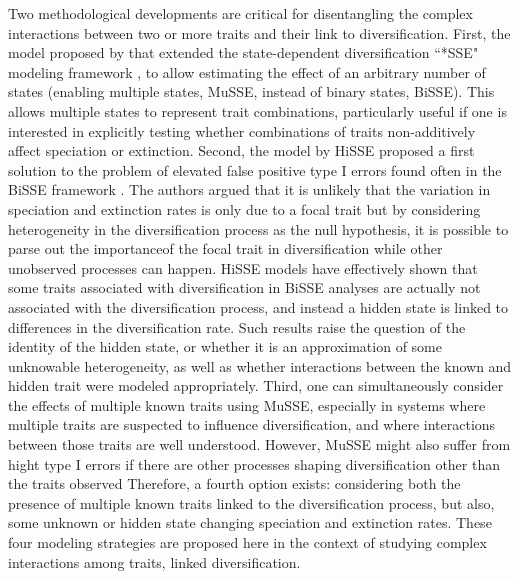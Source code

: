 Two methodological developments are critical for disentangling the complex interactions between two or more traits and their link to diversification.
First, the model proposed by \citet{fitzjohn_2012} that extended the state-dependent diversification ``*SSE" modeling framework \citep{maddison_2007}, to allow estimating the effect of an arbitrary number of states (enabling multiple states, MuSSE, instead of binary states, BiSSE). 
This allows multiple states to represent trait combinations, particularly useful if one is interested in explicitly testing whether combinations of traits non-additively affect speciation or extinction. 
Second, the model by \citet{beaulieu_2016} HiSSE proposed a first solution to the problem of  elevated false positive type I errors found often in the BiSSE framework \citep{goldberg_2012}. The authors argued that it is unlikely that the variation in speciation and extinction rates is only due to a focal trait but by considering heterogeneity in the diversification process as the null hypothesis, it is possible to parse out the importanceof the focal trait in diversification while other unobserved processes can happen. HiSSE models have effectively shown that some traits associated with diversification in BiSSE analyses are actually not associated with the diversification process, and instead a hidden state is linked to differences in the diversification rate.  Such results raise the question of the identity of the hidden state, or whether it is an approximation of some unknowable heterogeneity, as well as whether interactions between the known and hidden trait were modeled appropriately. 
Third, one can simultaneously consider the effects of multiple known traits using MuSSE, especially in systems where multiple traits are suspected to influence diversification, and where interactions between those traits are well understood. However, MuSSE might also suffer from hight type I errors if there are other processes shaping diversification other than the traits observed \citep{caetano_2018}
Therefore, a fourth option exists: considering both the presence of multiple known traits  linked to the diversification process, but also, some unknown or hidden state changing speciation and extinction rates. 
These four modeling strategies are proposed here in the context of studying complex interactions among traits, linked diversification.

